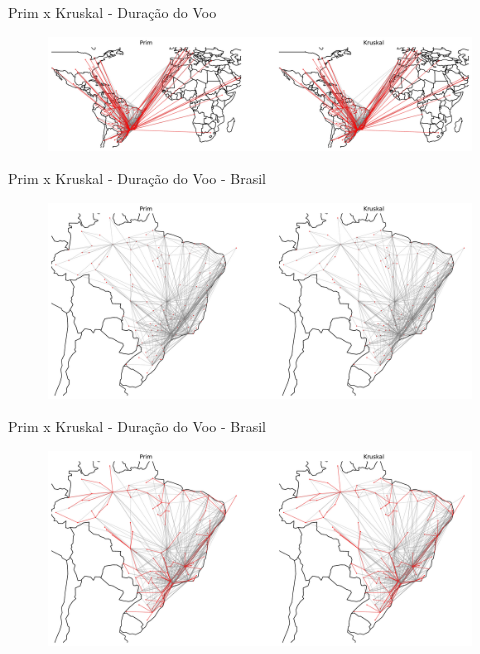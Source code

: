 \documentclass[aspectratio=169,usenames,dvipsnames]{beamer}
\begin{document}
\begin{frame}{Prim x Kruskal - Duração do Voo}
    \begin{figure}[ht]
        \centering
        \includegraphics[width=\textwidth]{figs/world_time_mst_1.pdf}
    \end{figure}
\end{frame}

\begin{frame}{Prim x Kruskal - Duração do Voo - Brasil}
    \begin{figure}[ht]
        \centering
        \includegraphics[width=\textwidth]{figs/brasil_time_mst_0.pdf}
    \end{figure}
\end{frame}

\begin{frame}{Prim x Kruskal - Duração do Voo - Brasil}
    \begin{figure}[ht]
        \centering
        \includegraphics[width=\textwidth]{figs/brasil_time_mst_1.pdf}
    \end{figure}
\end{frame}
\end{document}
